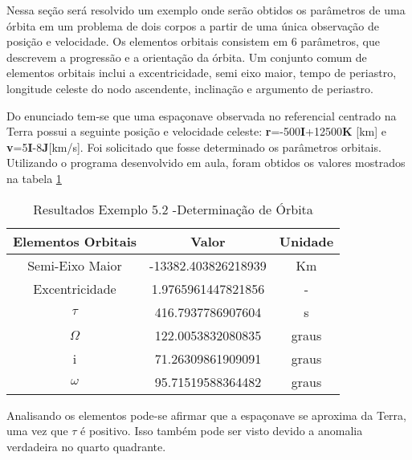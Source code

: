 \par Nessa seção será resolvido um exemplo onde serão obtidos os parâmetros de uma órbita em um problema de dois corpos a partir de uma única observação de posição e velocidade. Os elementos orbitais consistem em 6 parâmetros, que descrevem a progressão e a orientação da órbita. Um conjunto comum de elementos orbitais inclui a excentricidade, semi eixo maior, tempo de periastro, longitude celeste do nodo ascendente, inclinação e argumento de periastro. 
\par Do enunciado tem-se que uma espaçonave observada no referencial centrado na Terra possui a seguinte posição e velocidade celeste: \textbf{r}=-500\textbf{I}+12500\textbf{K} [km] e \textbf{v}=5\textbf{I}-8\textbf{J}[km/s]. Foi solicitado que fosse determinado os parâmetros orbitais. Utilizando o programa desenvolvido em aula, foram obtidos os valores mostrados na tabela \ref{ex52}

\begin{table}[H]
\centering
\caption{Resultados Exemplo 5.2 -Determinação de Órbita}
\begin{tabular}{|c|c|c|}
\hline
Elementos Orbitais & Valor               & Unidade \\ \hline
Semi-Eixo Maior          & -13382.403826218939 & Km      \\ \hline
Excentricidade          & 1.9765961447821856  & - \\ \hline
$\tau$        & 416.7937786907604   & s       \\ \hline
$\Omega$      & 122.0053832080835   & graus   \\ \hline
i          & 71.26309861909091   & graus   \\ \hline
$\omega$      & 95.71519588364482   & graus   \\ \hline
\end{tabular}
\label{ex52}
\end{table}

\par Analisando os elementos pode-se afirmar que a espaçonave se aproxima da Terra, uma vez que $\tau$ é positivo. Isso também pode ser visto devido a anomalia verdadeira no quarto quadrante.

\nocite{book:226549}